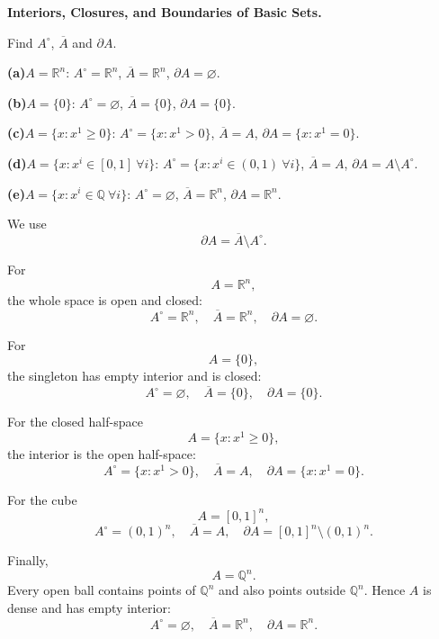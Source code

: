 \begin{problem}[CP-II-0213]
\label{prob:cp-ii-0213}
\textbf{Interiors, Closures, and Boundaries of Basic Sets.}

\hspace*{1.5em}Find $A^\circ$, $\overline{A}$ and $\partial A$.

\renewcommand\labelenumi{(\alph{enumi})}
\par\smallskip\noindent\textbf{(a)}\quad $A=\mathbb{R}^n$: $A^\circ=\mathbb{R}^n$, $\overline{A}=\mathbb{R}^n$, $\partial A=\varnothing$.
\par\smallskip\noindent\textbf{(b)}\quad $A=\{0\}$: $A^\circ=\varnothing$, $\overline{A}=\{0\}$, $\partial A=\{0\}$.
\par\smallskip\noindent\textbf{(c)}\quad $A=\{x:x^1\ge 0\}$: $A^\circ=\{x:x^1>0\}$, $\overline{A}=A$, $\partial A=\{x:x^1=0\}$.
\par\smallskip\noindent\textbf{(d)}\quad $A=\{x:x^i\in[0,1]\ \forall i\}$: $A^\circ=\{x:x^i\in(0,1)\ \forall i\}$, $\overline{A}=A$, $\partial A=A\setminus A^\circ$.
\par\smallskip\noindent\textbf{(e)}\quad $A=\{x:x^i\in\mathbb{Q}\ \forall i\}$: $A^\circ=\varnothing$, $\overline{A}=\mathbb{R}^n$, $\partial A=\mathbb{R}^n$.
\end{problem}

\begin{solution}
We use
\[
\partial A=\overline A\setminus A^\circ.
\]

For
\[
A=\mathbb R^n,
\]
the whole space is open and closed:
\[
\boxed{
A^\circ=\mathbb R^n,\quad
\overline A=\mathbb R^n,\quad
\partial A=\varnothing.
}
\]

For
\[
A=\{0\},
\]
the singleton has empty interior and is closed:
\[
\boxed{
A^\circ=\varnothing,\quad
\overline A=\{0\},\quad
\partial A=\{0\}.
}
\]

For the closed half-space
\[
A=\{x:x^1\ge0\},
\]
the interior is the open half-space:
\[
\boxed{
A^\circ=\{x:x^1>0\},\quad
\overline A=A,\quad
\partial A=\{x:x^1=0\}.
}
\]

For the cube
\[
A=[0,1]^n,
\]
\[
\boxed{
A^\circ=(0,1)^n,\quad
\overline A=A,\quad
\partial A=[0,1]^n\setminus(0,1)^n.
}
\]

Finally,
\[
A=\mathbb Q^n.
\]
Every open ball contains points of \(\mathbb Q^n\) and also points outside
\(\mathbb Q^n\). Hence \(A\) is dense and has empty interior:
\[
\boxed{
A^\circ=\varnothing,\quad
\overline A=\mathbb R^n,\quad
\partial A=\mathbb R^n.
}
\]
\end{solution}


